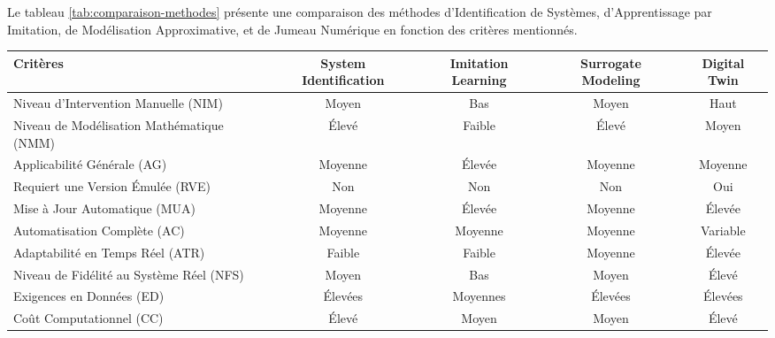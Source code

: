 \documentclass[sigconf,anonymous]{aamas}
\begin{document}
Le tableau \ref{tab:comparaison-methodes} présente une comparaison des méthodes d'Identification de Systèmes, d'Apprentissage par Imitation, de Modélisation Approximative, et de Jumeau Numérique en fonction des critères mentionnés.

\begin{table*}[h!]
\centering
\caption{Comparaison des méthodes de modélisation automatisée selon différents critères}
\begin{tabular}{|p{5cm}|c|c|c|c|}
\hline
\textbf{Critères}                   & \textbf{System Identification} & \textbf{Imitation Learning} & \textbf{Surrogate Modeling} & \textbf{Digital Twin} \\
\hline
Niveau d'Intervention Manuelle (NIM)    & Moyen                         & Bas                          & Moyen                       & Haut                 \\
Niveau de Modélisation Mathématique (NMM) & Élevé                         & Faible                       & Élevé                       & Moyen                \\
Applicabilité Générale (AG)             & Moyenne                       & Élevée                       & Moyenne                     & Moyenne              \\
Requiert une Version Émulée (RVE)       & Non                           & Non                          & Non                         & Oui                  \\
Mise à Jour Automatique (MUA)           & Moyenne                       & Élevée                       & Moyenne                     & Élevée               \\
Automatisation Complète (AC)            & Moyenne                       & Moyenne                      & Moyenne                     & Variable             \\
Adaptabilité en Temps Réel (ATR)        & Faible                        & Faible                       & Moyenne                     & Élevée               \\
Niveau de Fidélité au Système Réel (NFS) & Moyen                         & Bas                          & Moyen                       & Élevé                \\
Exigences en Données (ED)               & Élevées                       & Moyennes                     & Élevées                     & Élevées              \\
Coût Computationnel (CC)                & Élevé                         & Moyen                        & Moyen                       & Élevé                \\
\hline
\end{tabular}
\label{tab:comparaison-methodes}
\end{table*}
\end{document}
